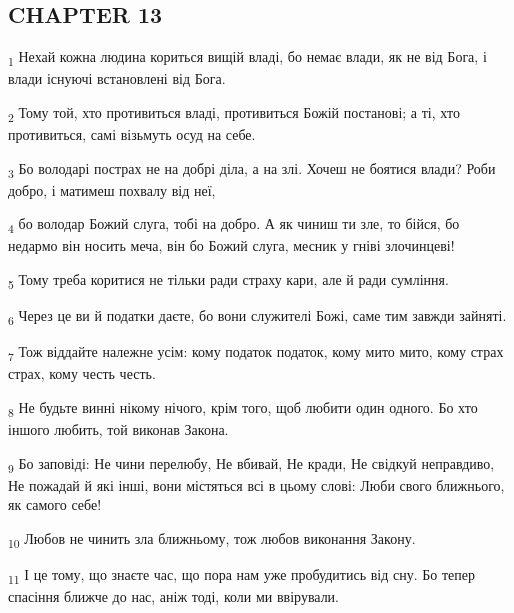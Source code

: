 \subsection{CHAPTER 13}
\begin{tcolorbox}
\textsubscript{1} Нехай кожна людина кориться вищій владі, бо немає влади, як не від Бога, і влади існуючі встановлені від Бога.
\end{tcolorbox}
\begin{tcolorbox}
\textsubscript{2} Тому той, хто противиться владі, противиться Божій постанові; а ті, хто противиться, самі візьмуть осуд на себе.
\end{tcolorbox}
\begin{tcolorbox}
\textsubscript{3} Бо володарі пострах не на добрі діла, а на злі. Хочеш не боятися влади? Роби добро, і матимеш похвалу від неї,
\end{tcolorbox}
\begin{tcolorbox}
\textsubscript{4} бо володар Божий слуга, тобі на добро. А як чиниш ти зле, то бійся, бо недармо він носить меча, він бо Божий слуга, месник у гніві злочинцеві!
\end{tcolorbox}
\begin{tcolorbox}
\textsubscript{5} Тому треба коритися не тільки ради страху кари, але й ради сумління.
\end{tcolorbox}
\begin{tcolorbox}
\textsubscript{6} Через це ви й податки даєте, бо вони служителі Божі, саме тим завжди зайняті.
\end{tcolorbox}
\begin{tcolorbox}
\textsubscript{7} Тож віддайте належне усім: кому податок податок, кому мито мито, кому страх страх, кому честь честь.
\end{tcolorbox}
\begin{tcolorbox}
\textsubscript{8} Не будьте винні нікому нічого, крім того, щоб любити один одного. Бо хто іншого любить, той виконав Закона.
\end{tcolorbox}
\begin{tcolorbox}
\textsubscript{9} Бо заповіді: Не чини перелюбу, Не вбивай, Не кради, Не свідкуй неправдиво, Не пожадай й які інші, вони містяться всі в цьому слові: Люби свого ближнього, як самого себе!
\end{tcolorbox}
\begin{tcolorbox}
\textsubscript{10} Любов не чинить зла ближньому, тож любов виконання Закону.
\end{tcolorbox}
\begin{tcolorbox}
\textsubscript{11} І це тому, що знаєте час, що пора нам уже пробудитись від сну. Бо тепер спасіння ближче до нас, аніж тоді, коли ми ввірували.
\end{tcolorbox}
